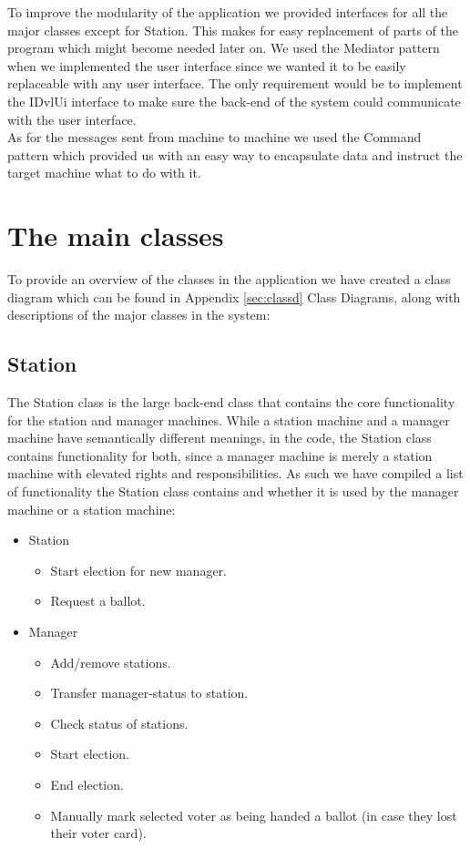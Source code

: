 \documentclass[a4paper]{report}
\begin{document}
To improve the modularity of the application we provided interfaces for all the major classes except for Station. This makes for easy replacement of parts of the program which might become needed later on. We used the Mediator pattern \cite{medi} when we implemented the user interface since we wanted it to be easily replaceable with any user interface. The only requirement would be to implement the IDvlUi interface to make sure the back-end of the system could communicate with the user interface. \\

As for the messages sent from machine to machine we used the Command pattern \cite{cmdp} which provided us with an easy way to encapsulate data and instruct the target machine what to do with it. 

\section{The main classes}
To provide an overview of the classes in the application we have created a class diagram which can be found in Appendix \ref{sec:classd} Class Diagrams, along with descriptions of the major classes in the system:

\subsection{Station}
The Station class is the large back-end class that contains the core functionality for the station and manager machines. While a station machine and a manager machine have semantically different meanings, in the code, the Station class contains functionality for both, since a manager machine is merely a station machine with elevated rights and responsibilities. As such we have compiled a list of functionality the Station class contains and whether it is used by the manager machine or a station machine:

\begin{itemize}
\item Station
\begin{itemize}
\item Start election for new manager.
\item Request a ballot.
\end{itemize}


\item Manager
\begin{itemize}
\item Add/remove stations.
\item Transfer manager-status to station.
\item Check status of stations.
\item Start election.
\item End election.
\item Manually mark selected voter as being handed a ballot (in case they lost their voter card).
\end{itemize}
\end{itemize}
\end{document}
